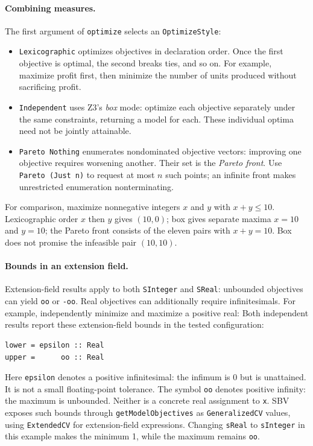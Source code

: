 \documentclass[acmsmall,screen,review,anonymous,nonacm]{acmart}
\newcommand{\code}[1]{\texttt{#1}}
\begin{document}
\paragraph{Combining measures.}
The first argument of \code{optimize} selects an \code{OptimizeStyle}:
\begin{itemize}
\item \code{Lexicographic} optimizes objectives in declaration order. Once the
  first objective is optimal, the second breaks ties, and so on. For example,
  maximize profit first, then minimize the number of units produced without
  sacrificing profit.
\item \code{Independent} uses Z3's \emph{box} mode: optimize each objective
  separately under the same constraints, returning a model for each. These
  individual optima need not be jointly attainable.
\item \code{Pareto Nothing} enumerates nondominated objective vectors: improving
  one objective requires worsening another. Their set is the \emph{Pareto front}.
  Use \code{Pareto (Just n)} to request at most $n$ such points; an infinite
  front makes unrestricted enumeration nonterminating.
\end{itemize}
For comparison, maximize nonnegative integers $x$ and $y$ with
$x+y\leq 10$. Lexicographic order $x$ then $y$ gives $(10,0)$; box gives separate
maxima $x=10$ and $y=10$; the Pareto front consists of the eleven pairs with
$x+y=10$. Box does not promise the infeasible pair $(10,10)$.

\paragraph{Bounds in an extension field.}
Extension-field results apply to both \code{SInteger} and \code{SReal}:
unbounded objectives can yield \code{oo} or \code{-oo}. Real objectives can
additionally require infinitesimals. For example, independently minimize and
maximize a positive real:
Both independent results report these extension-field bounds in the tested configuration:
\begin{lstlisting}[style=output]
lower = epsilon :: Real
upper =      oo :: Real
\end{lstlisting}
Here \code{epsilon} denotes a positive infinitesimal: the infimum is 0 but is
unattained. It is not a small floating-point tolerance. The symbol \code{oo}
denotes positive infinity: the maximum is unbounded. Neither is a concrete
real assignment to \code{x}. SBV exposes such bounds through
\code{getModelObjectives} as \code{GeneralizedCV} values, using \code{ExtendedCV}
for extension-field expressions.
Changing \code{sReal} to \code{sInteger} in this example makes the minimum 1,
while the maximum remains \code{oo}.
\end{document}
